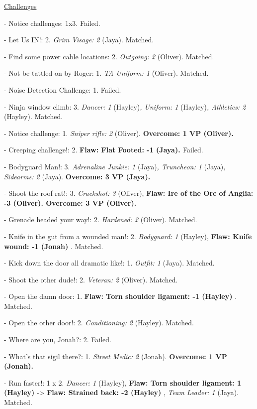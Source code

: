 \underline{  {\LARGE Challenges }  }



- Notice challenges: 1x3.  Failed.

- Let Us IN!: 2.  \textit{Grim Visage: 2} (Jaya).  Matched. 

- Find some power cable locations: 2.  \textit{Outgoing: 2} (Oliver). Matched. 

- Not be tattled on by Roger: 1.  \textit{TA Uniform: 1} (Oliver). Matched.

- Noise Detection Challenge: 1. Failed.

- Ninja window climb: 3.  \textit{Dancer: 1 }(Hayley)\textit{, Uniform: 1} (Hayley)\textit{, Athletics: 2 }(Hayley). Matched.

- Notice challenge: 1.  \textit{Sniper rifle: 2} (Oliver). \textbf{ {\color[RGB]{0,0,255}Overcome: 1 VP (Oliver).} }

- Creeping challenge!: 2.  \textbf{ {\color[RGB]{255,0,0}Flaw: Flat Footed: -1 (Jaya). } }Failed.

- Bodyguard Man!: 3.  \textit{Adrenaline Junkie: 1} (Jaya)\textit{, Truncheon: 1} (Jaya)\textit{, Sidearms: 2} (Jaya). \textbf{ {\color[RGB]{0,0,255}Overcome: 3 VP (Jaya).} }

- Shoot the roof rat!: 3.  \textit{Crackshot: 3} (Oliver), \textbf{ {\color[RGB]{255,0,0}Flaw: Ire of the Orc of Anglia: -3 (Oliver). } }\textbf{ {\color[RGB]{0,0,255}Overcome: 3 VP (Oliver).} }

- Grenade headed your way!: 2.  \textit{Hardened: 2} (Oliver). Matched.

- Knife in the gut from a wounded man!: 2.  \textit{Bodyguard: 1} (Hayley), \textbf{ {\color[RGB]{255,0,0}Flaw: Knife wound: -1 (Jonah)} }. Matched. 

- Kick down the door all dramatic like!: 1. \textit{Outfit: 1} (Jaya). Matched.

- Shoot the other dude!: 2.  \textit{Veteran: 2} (Oliver). Matched. 

- Open the damn door: 1.  \textbf{ {\color[RGB]{255,0,0}Flaw: Torn shoulder ligament: -1 (Hayley)} }. Matched. 

- Open the other door!: 2.  \textit{Conditioning: 2} (Hayley). Matched. 

- Where are you, Jonah?: 2.  Failed.

- What's that sigil there?: 1. \textit{Street Medic: 2} (Jonah). \textbf{ {\color[RGB]{0,0,255}Overcome: 1 VP (Jonah).} }

- Run faster!: 1 x 2.  \textit{Dancer: 1} (Hayley), \textbf{ {\color[RGB]{255,0,0}Flaw: Torn shoulder ligament: 1 (Hayley)} } -\textgreater  \textbf{ {\color[RGB]{255,0,0}Flaw: Strained back: -2 (Hayley)} }, \textit{Team Leader: 1} (Jaya). Matched.

